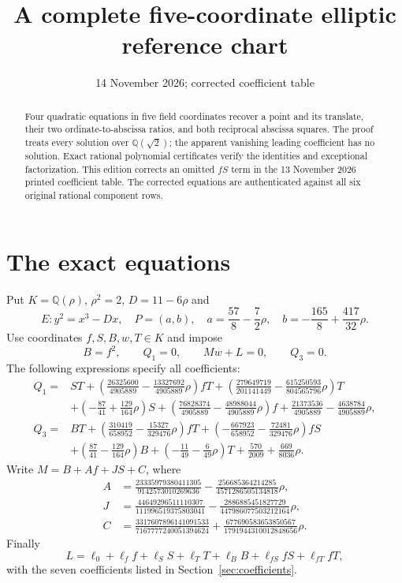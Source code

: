 \documentclass[11pt,a4paper]{article}
\title{A complete five-coordinate elliptic reference chart}
\author{}\date{14 November 2026; corrected coefficient table}
\newcommand{\Q}{\mathbb Q}\DeclareMathOperator{\Nm}{Nm}
\begin{document}
\maketitle
\begin{abstract}
Four quadratic equations in five field coordinates recover a point and
its translate, their two ordinate-to-abscissa ratios, and both reciprocal
abscissa squares. The proof treats every solution over $\Q(\sqrt2)$;
the apparent vanishing leading coefficient has no solution. Exact
rational polynomial certificates verify the identities and exceptional
factorization. This edition corrects an omitted $fS$ term in the
13 November 2026 printed coefficient table. The corrected equations
are authenticated against all six original rational component rows.
\end{abstract}

\section{The exact equations}
Put $K=\Q(\rho)$, $\rho^2=2$, $D=11-6\rho$ and
\[
 E:y^2=x^3-Dx,\quad P=(a,b),\quad
 a=\frac{57}8-\frac72\rho,\quad b=-\frac{165}8+\frac{417}{32}\rho.
\]
Use coordinates $f,S,B,w,T\in K$ and impose
\begin{equation}\label{eq:system}
 B=f^2,\qquad Q_1=0,\qquad Mw+L=0,\qquad Q_3=0.
\end{equation}
The following expressions specify all coefficients:
\begin{align*}
Q_1={}&ST+\left(\frac{26325600}{4905889}-\frac{13327692}{4905889}\rho\right)fT
+\left(\frac{279649719}{201141449}-\frac{615250593}{804565796}\rho\right)T\\
&+\left(-\frac{87}{41}+\frac{129}{164}\rho\right)S
+\left(\frac{76828374}{4905889}-\frac{48988044}{4905889}\rho\right)f
+\frac{21373536}{4905889}-\frac{4638784}{4905889}\rho,\\
Q_3={}&BT+\left(\frac{310419}{658952}-\frac{15327}{329476}\rho\right)fT
+\left(-\frac{667923}{658952}-\frac{72481}{329476}\rho\right)fS\\
&+\left(\frac{87}{41}-\frac{129}{164}\rho\right)B
+\left(-\frac{11}{49}-\frac6{49}\rho\right)T
+\frac{570}{2009}+\frac{669}{8036}\rho.
\end{align*}
Write $M=B+Af+JS+C$, where
\begin{align*}
 A&=\frac{23335979380411305}{9142573010269636}
       -\frac{256685364214285}{4571286505134818}\rho,\\
 J&=\frac{44649296511110307}{111996519375803041}
       -\frac{2886885451827729}{447986077503212164}\rho,\\
 C&=\frac{3317607896141091533}{7167777240051394624}
       +\frac{677690583653850567}{1791944310012848656}\rho.
\end{align*}
Finally
\[
 L=\ell_0+\ell_f f+\ell_S S+\ell_T T+\ell_B B+\ell_{fS}fS+\ell_{fT}fT,
\]
with the seven coefficients listed in Section~\ref{sec:coefficients}.
\end{document}
